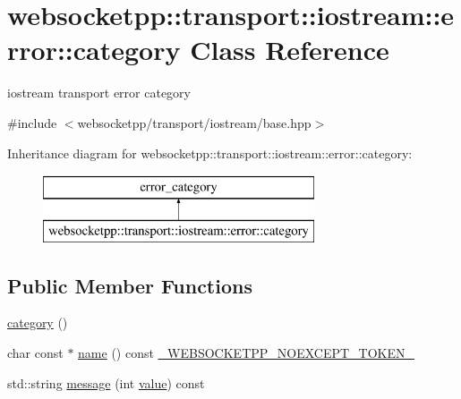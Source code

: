 \hypertarget{classwebsocketpp_1_1transport_1_1iostream_1_1error_1_1category}{}\section{websocketpp\+:\+:transport\+:\+:iostream\+:\+:error\+:\+:category Class Reference}
\label{classwebsocketpp_1_1transport_1_1iostream_1_1error_1_1category}


iostream transport error category  




{\ttfamily \#include $<$websocketpp/transport/iostream/base.\+hpp$>$}

Inheritance diagram for websocketpp\+:\+:transport\+:\+:iostream\+:\+:error\+:\+:category\+:\begin{figure}[H]
\begin{center}
\leavevmode
\includegraphics[height=2.000000cm]{classwebsocketpp_1_1transport_1_1iostream_1_1error_1_1category}
\end{center}
\end{figure}
\subsection*{Public Member Functions}
\begin{DoxyCompactItemize}
\item 
\hyperlink{classwebsocketpp_1_1transport_1_1iostream_1_1error_1_1category_afc26564130aecc3d3984536435371df5}{category} ()
\item 
char const $\ast$ \hyperlink{classwebsocketpp_1_1transport_1_1iostream_1_1error_1_1category_a64f1fd16853587d751680244b8d105c6}{name} () const \hyperlink{boost__config_8hpp_aa19747404a5f2fe9c9eb9e9d2e48f26c}{\+\_\+\+W\+E\+B\+S\+O\+C\+K\+E\+T\+P\+P\+\_\+\+N\+O\+E\+X\+C\+E\+P\+T\+\_\+\+T\+O\+K\+E\+N\+\_\+}
\item 
std\+::string \hyperlink{classwebsocketpp_1_1transport_1_1iostream_1_1error_1_1category_afc182935da3ccf1c8965e5634c21a1b8}{message} (int \hyperlink{namespacewebsocketpp_1_1transport_1_1iostream_1_1error_a647b428e260748d7606c92255e1e9737}{value}) const 
\end{DoxyCompactItemize}


